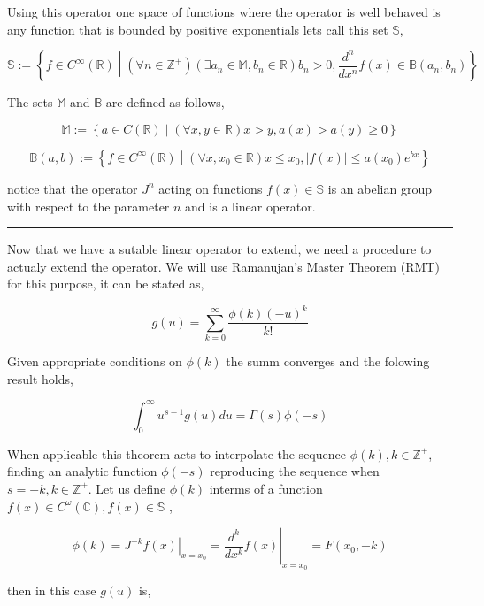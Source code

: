 \documentclass[%
 preprint,
 amsmath, amssymb, aps, pra, 10pt
]{revtex4-2}
\begin{document}
Using this operator one space of functions where the operator is well behaved is any function that is bounded by positive exponentials lets call this set $\mathbb{S}$,

\begin{equation}
\mathbb{S} := \left\lbrace f \in C^\infty(\mathbb{R}) \middle| (\forall n \in \mathbb{Z}^+)(\exists a_n \in \mathbb{M}, b_n \in \mathbb{R}) b_n > 0, \frac{d^n}{dx^n}f(x) \in \mathbb{B}(a_n, b_n) \right\rbrace
\label{exponentialy_bounded}
\end{equation}

The sets $\mathbb{M}$ and $\mathbb{B}$ are defined as follows,

\[\mathbb{M} := \left\lbrace a \in C(\mathbb{R}) \middle| (\forall x, y \in \mathbb{R}) x > y, a(x) > a(y) \geq 0 \right\rbrace\]

\[\mathbb{B}(a, b) := \left\lbrace f \in C^\infty(\mathbb{R}) \middle| (\forall x, x_0 \in \mathbb{R}) x \leq x_0, |f(x)| \leq a(x_0)e^{bx} \right\rbrace\]

notice that the operator $J^n$ acting on functions $f(x) \in \mathbb{S}$ is an abelian group with respect to the parameter $n$ and is a linear operator.

\noindent\rule{\textwidth}{1pt}

Now that we have a sutable linear operator to extend, we need a procedure to actualy extend the operator. We will use Ramanujan's Master Theorem (RMT) for this purpose, it can be stated as,

\[g(u) = \sum_{k=0}^\infty \frac{\phi(k)(-u)^k}{k!}\]

Given appropriate conditions on $\phi(k)$ the summ converges and the folowing result holds,

\[\int_0^{\infty} u^{s-1}g(u)du = \Gamma(s)\phi(-s)\]

When applicable this theorem acts to interpolate the sequence $\phi(k), k \in \mathbb{Z}^+$, finding an analytic function $\phi(-s)$ reproducing the sequence when $s = -k, k \in \mathbb{Z}^+$. Let us define $\phi(k)$ interms of a function $f(x) \in C^{\omega}(\mathbb{C}), f(x) \in \mathbb{S}$ ,

\[\phi(k) = \left. J^{-k}f(x)\right|_{x = x_0} = \left. \frac{d^k}{dx^k}f(x) \right|_{x = x_0} = F(x_0, -k)\]

then in this case $g(u)$ is,
\end{document}
